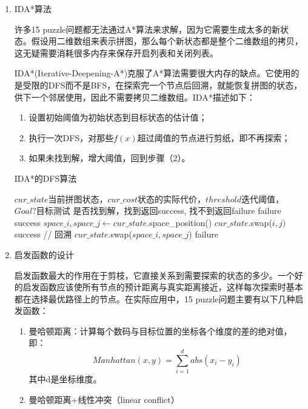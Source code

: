 \documentclass[10pt,letterpaper]{ctexart}
\begin{document}
\begin{enumerate}[itemindent=2.5em,label=\arabic*、]
    \item IDA*算法
    \par \qquad 许多15 puzzle问题都无法通过A*算法来求解，因为它需要生成太多的新状态。假设用二维数组来表示拼图，那么每个新状态都是整个二维数组的拷贝，这无疑需要消耗很多内存来保存开启列表和关闭列表。
    \par \qquad IDA*(Iterative-Deepening-A*)克服了A*算法需要很大内存的缺点。它使用的是受限的DFS而不是BFS，在探索完一个节点后回溯，就能恢复拼图的状态，供下一个邻居使用，因此不需要拷贝二维数组。IDA*描述如下：
    \begin{enumerate}[itemindent=1.5em,label=（\arabic*）]
        \item 设置初始阈值为初始状态到目标状态的估计值；
        \item 执行一次DFS，对那些$f(x)$超过阈值的节点进行剪纸，即不再探索；
        \item 如果未找到解，增大阈值，回到步骤（2）。
    \end{enumerate}

    \begin{algorithm}
      \caption{IDA*的DFS算法}
        \begin{algorithmic}[1] %
          \Require $cur\_state$当前拼图状态，$cur\_cost$状态的实际代价，$threshold$迭代阈值，$Goal?$目标测试
          \Ensure 是否找到解，找到返回success, 找不到返回failure
                \State \Return failure
              \EndIf
                \State \Return success
              \EndIf
              \State $space\_i, space\_j \gets cur\_state$.space\_position()
                \State $cur\_state$.swap($i, j)$
                  \State \Return success
                \EndIf
                \State // 回溯
                \State $cur\_state$.swap($space\_i, space\_j$)
              \EndFor
              \State \Return failure
            \EndFunction
        \end{algorithmic}
    \end{algorithm}
    \item 启发函数的设计
    \par \qquad 启发函数最大的作用在于剪枝，它直接关系到需要探索的状态的多少。一个好的启发函数应该使所有节点的预计距离与真实距离接近，这样每次探索时基本都在选择最优路径上的节点。在实际应用中，15 puzzle问题主要有以下几种启发函数：
    \begin{enumerate}[itemindent=1.5em,label=（\arabic*）]
      \item 曼哈顿距离：计算每个数码与目标位置的坐标各个维度的差的绝对值，即：
      \begin{equation}
        Manhattan(x,y) = \sum_{i=1}^d abs(x_i - y_i)
      \end{equation}
      其中d是坐标维度。
      \item 曼哈顿距离+线性冲突（linear conflict）


\end{enumerate}
\end{enumerate}
\end{document}
